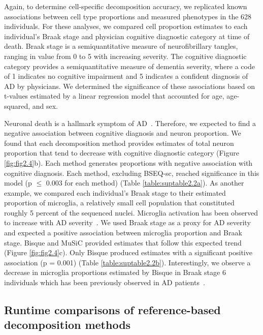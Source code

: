 Again, to determine cell-specific decomposition accuracy, we replicated known associations between cell type proportions and measured phenotypes in the 628 individuals. For these analyses, we compared cell proportion estimates to each individual’s Braak stage and physician cognitive diagnostic category at time of death. Braak stage is a semiquantitative measure of neurofibrillary tangles, ranging in value from 0 to 5 with increasing severity. The cognitive diagnostic category provides a semiquantitative measure of dementia severity, where a code of 1 indicates no cognitive impairment and 5 indicates a confident diagnosis of AD by physicians.  We determined the significance of these associations based on t-values estimated by a linear regression model that accounted for age, age-squared, and sex. 

Neuronal death is a hallmark symptom of AD~\cite{Yankner1996-lk}. Therefore, we expected to find a negative association between cognitive diagnosis and neuron proportion. We found that each decomposition method provides estimates of total neuron proportion that tend to decrease with cognitive diagnostic category (Figure \ref{fig:fig2.4}b). Each method generates proportions with negative association with cognitive diagnosis. Each method, excluding BSEQ-sc, reached significance in this model (p $\leq$ 0.003 for each method) (Table \ref{table:suptable2.2a}). As another example, we compared each individual’s Braak stage to their estimated proportion of microglia, a relatively small cell population that constituted roughly 5 percent of the sequenced nuclei. Microglia activation has been observed to increase with AD severity~\cite{Hansen2018-jj}. We used Braak stage as a proxy for AD severity and expected a positive association between microglia proportion and Braak stage. Bisque and MuSiC provided estimates that follow this expected trend (Figure \ref{fig:fig2.4}c). Only Bisque produced estimates with a significant positive association (p = 0.001) (Table \ref{table:suptable2.2b}). Interestingly, we observe a decrease in microglia proportions estimated by Bisque in Braak stage 6 individuals which has been previously observed in AD patients~\cite{Navarro2018-ti}.



\subsection{Runtime comparisons of reference-based decomposition methods}

